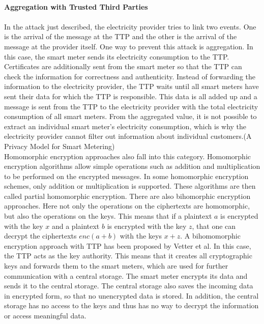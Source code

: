 \\
\textbf{Aggregation with Trusted Third Parties}
\\
\\
In the attack just described, the electricity provider tries to link two events. One is the arrival of the message at the TTP and the other is the arrival of the message at the provider itself. One way to prevent this attack is aggregation. In this case, the smart meter sends its electricity consumption to the TTP. Certificates are additionally sent from the smart meter so that the TTP can check the information for correctness and authenticity. Instead of forwarding the information to the electricity provider, the TTP waits until all smart meters have sent their data for which the TTP is responsible. This data is all added up and a message is sent from the TTP to the electricity provider with the total electricity consumption of all smart meters. From the aggregated value, it is not possible to extract an individual smart meter's electricity consumption, which is why the electricity provider cannot filter out information about individual customers.(A Privacy Model for Smart Metering)\\
Homomorphic encryption approaches also fall into this category. Homomorphic encryption algorithms allow simple operations such as addition and multiplication to be performed on the encrypted messages.  In some homomorphic encryption schemes, only addition or multiplication is supported. These algorithms are then called partial homomorphic encryption.
There are also bihomorphic encryption approaches. Here not only the operations on the ciphertexts are homomorphic, but also the operations on the keys. This means that if a plaintext $a$ is encrypted with the key $x$ and a plaintext $b$ is encrypted with the key $z$, that one can decrypt the ciphertexts $enc(a+b)$ with the keys $x+z$. A bihomomorphic encryption approach with TTP has been proposed by Vetter et al\cite{vetter2012homomorphic}. In this case, the TTP acts as the key authority. This means that it creates all cryptographic keys and forwards them to the smart meters, which are used for further communication with a central storage. The smart meter encrypts its data and sends it to the central storage. The central storage also saves the incoming data in encrypted form, so that no unencrypted data is stored. In addition, the central storage has no access to the keys and thus has no way to decrypt the information or access meaningful data.\\
